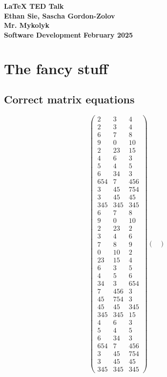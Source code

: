 \documentclass{article}%
\begin{document}
%
\normalsize%

    \noindent \textbf{\LARGE {LaTeX TED Talk}} \\
    \noindent \textbf{Ethan Sie, Sascha Gordon-Zolov \\ Mr. Mykolyk \\ Software Development} \hfill \textbf{February 2025}
\section{The fancy stuff}%
\label{sec:Thefancystuff}%
\subsection{Correct matrix equations}%
\label{subsec:Correctmatrixequations}%
\[%
\begin{pmatrix}%
2&3&4\\%
2&3&4\\%
6&7&8\\%
9&0&10\\%
2&23&15\\%
4&6&3\\%
5&4&5\\%
6&34&3\\%
654&7&456\\%
3&45&754\\%
3&45&45\\%
345&345&345\\%
6&7&8\\%
9&0&10\\%
2&23&2\\%
3&4&6\\%
7&8&9\\%
0&10&2\\%
23&15&4\\%
6&3&5\\%
4&5&6\\%
34&3&654\\%
7&456&3\\%
45&754&3\\%
45&45&345\\%
345&345&15\\%
4&6&3\\%
5&4&5\\%
6&34&3\\%
654&7&456\\%
3&45&754\\%
3&45&45\\%
345&345&345%
\end{pmatrix} \begin{pmatrix}%

\end{pmatrix}\]
\end{document}
